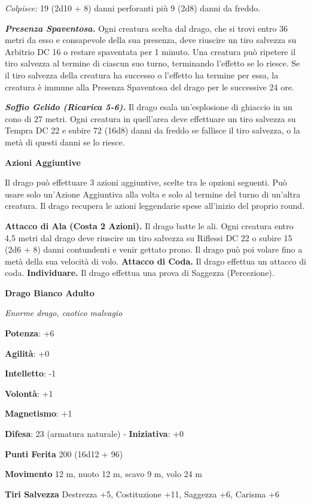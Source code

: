 \begin{multicols}{2}
\emph{Colpisce:} 19 (2d10 + 8) danni perforanti più 9 (2d8) danni da
freddo.

\emph{\textbf{Presenza Spaventosa.}} Ogni creatura scelta dal drago, che
si trovi entro 36 metri da esso e consapevole della sua presenza, deve
riuscire un tiro salvezza su Arbitrio DC 16 o restare spaventata per 1
minuto. Una creatura può ripetere il tiro salvezza al termine di ciascun
suo turno, terminando l'effetto se lo riesce. Se il tiro salvezza della
creatura ha successo o l'effetto ha termine per essa, la creatura è
immune alla Presenza Spaventosa del drago per le successive 24 ore.

\emph{\textbf{Soffio Gelido (Ricarica 5-6).}} Il drago esala
un'esplosione di ghiaccio in un cono di 27 metri. Ogni creatura in
quell'area deve effettuare un tiro salvezza su Tempra DC 22 e
subire 72 (16d8) danni da freddo se fallisce il tiro salvezza, o la metà
di questi danni se lo riesce.

\textbf{Azioni Aggiuntive}

Il drago può effettuare 3 azioni aggiuntive, scelte tra le opzioni
seguenti. Può usare solo un'Azione Aggiuntiva alla volta e solo al
termine del turno di un'altra creatura. Il drago recupera le azioni
leggendarie spese all'inizio del proprio round.

\textbf{Attacco di Ala (Costa 2 Azioni).} Il drago batte le ali. Ogni
creatura entro 4,5 metri dal drago deve riuscire un tiro salvezza su Riflessi DC 22 o subire 15 (2d6 + 8) danni contundenti e venir gettato
prono. Il drago può poi volare fino a metà della sua velocità di volo.
\textbf{Attacco di Coda.} Il drago effettua un attacco di coda.
\textbf{Individuare.} Il drago effettua una prova di Saggezza
(Percezione).

\textbf{Drago Bianco Adulto}

\emph{Enorme drago, caotico malvagio}

\textbf{Potenza}: +6

\textbf{Agilità}: +0

\textbf{Intelletto}: -1

\textbf{Volontà}: +1

\textbf{Magnetismo}: +1

\textbf{Difesa}: 23 (armatura naturale) - \textbf{Iniziativa}: +0

\textbf{Punti Ferita} 200 (16d12 + 96)

\textbf{Movimento} 12 m, nuoto 12 m, scavo 9 m, volo 24 m

\textbf{Tiri Salvezza} Destrezza +5, Costituzione +11, Saggezza +6,
Carisma +6


\end{multicols}

